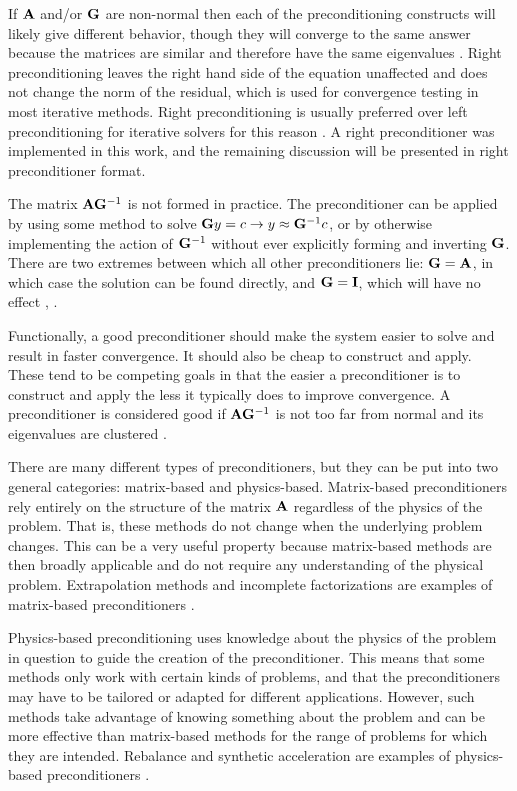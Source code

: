If $\mathbf{A}$ and/or $\mathbf{G}$ are non-normal then each of the preconditioning constructs will likely give different behavior, though they will converge to the same answer because the matrices are similar and therefore have the same eigenvalues  \cite{Benzi2002}. Right preconditioning leaves the right hand side of the equation unaffected and does not change the norm of the residual, which is used for convergence testing in most iterative methods. Right preconditioning is usually preferred over left preconditioning for iterative solvers for this reason \cite{Knoll2004}. A right preconditioner was implemented in this work, and the remaining discussion will be presented in right preconditioner format. 

The matrix $\mathbf{A}\mathbf{G}^{-1}$ is not formed in practice. The preconditioner can be applied by using some method to solve $\mathbf{G}y=c \to y \approx \mathbf{G}^{-1}c$, or by otherwise implementing the action of $\mathbf{G}^{-1}$ without ever explicitly forming and inverting $\mathbf{G}$. There are two extremes between which all other preconditioners lie: $\mathbf{G} = \mathbf{A}$, in which case the solution can be found directly, and $\mathbf{G} = \mathbf{I}$, which will have no effect \cite{Benzi2002}, \cite{Trefethen1997}. 

Functionally, a good preconditioner should make the system easier to solve and result in faster convergence. It should also be cheap to construct and apply. These tend to be competing goals in that the easier a preconditioner is to construct and apply the less it typically does to improve convergence. A preconditioner is considered good if $\mathbf{A}\mathbf{G}^{-1}$ is not too far from normal and its eigenvalues are clustered \cite{Trefethen1997}. 

There are many different types of preconditioners, but they can be put into two general categories: matrix-based and physics-based. Matrix-based preconditioners rely entirely on the structure of the matrix $\mathbf{A}$ regardless of the physics of the problem. That is, these methods do not change when the underlying problem changes. This can be a very useful property because matrix-based methods are then broadly applicable and do not require any understanding of the physical problem. Extrapolation methods and incomplete factorizations are examples of matrix-based preconditioners \cite{Trefethen1997}.

Physics-based preconditioning uses knowledge about the physics of the problem in question to guide the creation of the preconditioner. This means that some methods only work with certain kinds of problems, and that the preconditioners may have to be tailored or adapted for different applications. However, such methods take advantage of knowing something about the problem and can be more effective than matrix-based methods for the range of problems for which they are intended. Rebalance and synthetic acceleration are examples of physics-based preconditioners \cite{Trefethen1997}.

